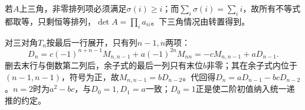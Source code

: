\label{der:1-2}
若$A$上三角，非零排列项必须满足$\sigma(i)\ge i$；而$\sum_i\sigma(i)=\sum_i i$，故所有不等式都取等，只剩恒等排列，$\det A=\prod_i a_{ii}$。下三角情况由转置得到。

对三对角$T_n$按最后一行展开，只有列$n-1,n$两项：
\[D_n=c(-1)^{n+n-1}M_{n,n-1}+a(-1)^{2n}M_{nn}=-cM_{n,n-1}+aD_{n-1}.\]
删去末行与倒数第二列后，余子式的最后一列只有末位$b$非零；其在余子式内位于$(n-1,n-1)$，符号为正，故$M_{n,n-1}=bD_{n-2}$。代回得$D_n=aD_{n-1}-bcD_{n-2}$。$n=2$时为$a^2-bc$，与$D_0=1,D_1=a$一致；$D_0=1$正是使二阶初值纳入统一递推的约定。
